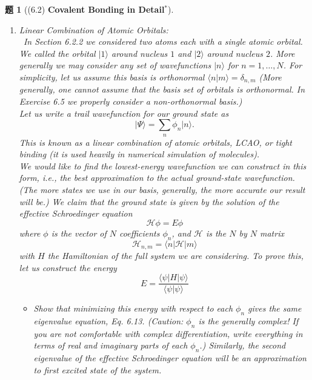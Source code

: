 \documentclass[UTF8,10pt,a4paper]{article}
\theoremstyle{Problem}
\newtheorem{prob}{题}
\theoremstyle{Solution}
\begin{document}
\begin{prob}[(6.2) \textbf{Covalent Bonding in Detail$^*$}]
    \begin{enumerate}
        \item[(a)] \textit{Linear Combination of Atomic Orbitals}:\\\
        In Section 6.2.2 we considered two atoms each with a single atomic orbital. We called the orbital $\lvert 1\rangle$ around nucleus $1$ and $\lvert 2\rangle$ around nucleus $2$. More generally we may consider any set of wavefunctions $\lvert n\rangle$ for $n=1,\dots,N$. For simplicity, let us assume this basis is orthonormal $\langle n\vert m\rangle=\delta_{n,m}$ (More generally, one cannot assume that the basis set of orbitals is orthonormal. In Exercise 6.5 we properly consider a non-orthonormal basis.)\\
        Let us write a trail wavefunction for our ground state as
        \[
            \lvert\Psi\rangle=\sum_n\phi_n\lvert n\rangle.
        \]
        This is known as a linear combination of atomic orbitals, LCAO, or tight binding (it is used heavily in numerical simulation of molecules).\\
        We would like to find the lowest-energy wavefunction we can constract in this form, i.e., the best approximation to the actual ground-state wavefunction. (The more states we use in our basis, generally, the more accurate our result will be.) We claim that the ground state is given by the solution of the effective Schroedinger equation
        \[
            \mathcal{H}\phi=E\phi\tag{6.13}
        \]
        where $\phi$ is the vector of $N$ coefficients $\phi_n$, and $\mathcal{H}$ is the $N$ by $N$ matrix
        \[
            \mathcal{H}_{n,m}=\langle n\lvert\mathcal{H}\rvert m\rangle
        \]
        with $H$ the Hamiltonian of the full system we are considering. To prove this, let us construct the energy
        \[
            E=\frac{\langle\psi\lvert H\rvert\psi\rangle}{\langle\psi\vert\psi\rangle}
        \]
        \begin{itemize}
            \item[$\triangleright$] Show that minimizing this energy with respect to each $\phi_n$ gives the same eigenvalue equation, Eq. 6.13. (Caution: $\phi_n$ is the generally complex! If you are not comfortable with complex differentiation, write everything in terms of real and imaginary parts of each $\phi_n$.) Similarly, the second eigenvalue of the effective Schroedinger equation will be an approximation to first excited state of the system.

\end{itemize}
\end{enumerate}
\end{prob}
\end{document}
